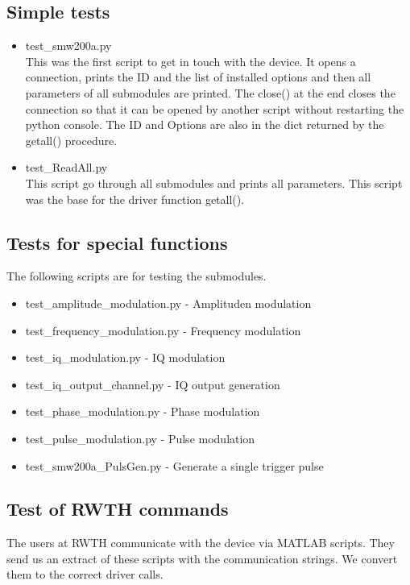 \documentclass[11pt]{article} %
\begin{document}
\subsection{Simple tests}
\begin{itemize}
\item test\_smw200a.py \\
This was the first script to get in touch with the device. It opens a connection, prints the ID and the list of installed options and then all parameters of all submodules are printed. The close() at the end closes the connection so that it can be opened by another script without restarting the python console. The ID and Options are also in the dict returned by the getall() procedure.

\item test\_ReadAll.py \\
This script go through all submodules and prints all parameters. This script was the base for the driver function getall().
\end{itemize}

\subsection{Tests for special functions}
The following scripts are for testing the submodules.
\begin{itemize}
\item test\_amplitude\_modulation.py - Amplituden modulation
\item test\_frequency\_modulation.py - Frequency modulation
\item test\_iq\_modulation.py - IQ modulation
\item test\_iq\_output\_channel.py - IQ output generation
\item test\_phase\_modulation.py - Phase modulation
\item test\_pulse\_modulation.py - Pulse modulation
\item test\_smw200a\_PulsGen.py - Generate a single trigger pulse
\end{itemize}

\subsection{Test of RWTH commands}
The users at RWTH communicate with the device via MATLAB scripts. They send us an extract of these scripts with the communication strings. We convert them to the correct driver calls.
\end{document}
